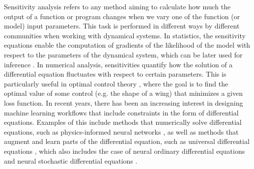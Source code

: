 Sensitivity analysis refers to any method aiming to calculate how much the output of a function or program changes when we vary one of the function (or model) input parameters. 
This task is performed in different ways by different communities when working with dynamical systems. 
In statistics, the sensitivity equations enable the computation of gradients of the likelihood of the model with respect to the parameters of the dynamical system, which can be later used for inference \cite{ramsay2017dynamic}. 
In numerical analysis, sensitivities quantify how the solution of a differential equation fluctuates with respect to certain parameters. 
This is particularly useful in optimal control theory \cite{Giles_Pierce_2000}, where the goal is to find the optimal value of some control (e.g. the shape of a wing) that minimizes a given loss function. 
In recent years, there has been an increasing interest in designing machine learning workflows that include constraints in the form of differential equations. 
Examples of this include methods that numerically solve differential equations, such as physics-informed neural networks \cite{PINNs_2019}, as well as methods that augment and learn parts of the differential equation, such as universal differential equations \cite{rackauckas2020universal, Dandekar_2020}, which also includes the case of neural ordinary differential equations \cite{chen_neural_2019} and neural stochastic differential equations \cite{li2020scalable}.

